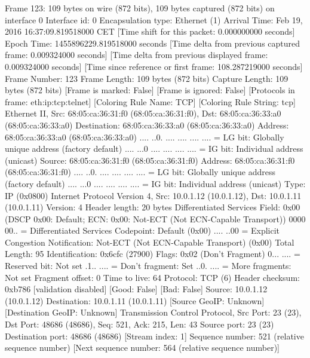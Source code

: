 Frame 123: 109 bytes on wire (872 bits), 109 bytes captured (872 bits) on interface 0
    Interface id: 0
    Encapsulation type: Ethernet (1)
    Arrival Time: Feb 19, 2016 16:37:09.819518000 CET
    [Time shift for this packet: 0.000000000 seconds]
    Epoch Time: 1455896229.819518000 seconds
    [Time delta from previous captured frame: 0.009324000 seconds]
    [Time delta from previous displayed frame: 0.009324000 seconds]
    [Time since reference or first frame: 108.287219000 seconds]
    Frame Number: 123
    Frame Length: 109 bytes (872 bits)
    Capture Length: 109 bytes (872 bits)
    [Frame is marked: False]
    [Frame is ignored: False]
    [Protocols in frame: eth:ip:tcp:telnet]
    [Coloring Rule Name: TCP]
    [Coloring Rule String: tcp]
Ethernet II, Src: 68:05:ca:36:31:f0 (68:05:ca:36:31:f0), Dst: 68:05:ca:36:33:a0 (68:05:ca:36:33:a0)
    Destination: 68:05:ca:36:33:a0 (68:05:ca:36:33:a0)
        Address: 68:05:ca:36:33:a0 (68:05:ca:36:33:a0)
        .... ..0. .... .... .... .... = LG bit: Globally unique address (factory default)
        .... ...0 .... .... .... .... = IG bit: Individual address (unicast)
    Source: 68:05:ca:36:31:f0 (68:05:ca:36:31:f0)
        Address: 68:05:ca:36:31:f0 (68:05:ca:36:31:f0)
        .... ..0. .... .... .... .... = LG bit: Globally unique address (factory default)
        .... ...0 .... .... .... .... = IG bit: Individual address (unicast)
    Type: IP (0x0800)
Internet Protocol Version 4, Src: 10.0.1.12 (10.0.1.12), Dst: 10.0.1.11 (10.0.1.11)
    Version: 4
    Header length: 20 bytes
    Differentiated Services Field: 0x00 (DSCP 0x00: Default; ECN: 0x00: Not-ECT (Not ECN-Capable Transport))
        0000 00.. = Differentiated Services Codepoint: Default (0x00)
        .... ..00 = Explicit Congestion Notification: Not-ECT (Not ECN-Capable Transport) (0x00)
    Total Length: 95
    Identification: 0x6cfc (27900)
    Flags: 0x02 (Don't Fragment)
        0... .... = Reserved bit: Not set
        .1.. .... = Don't fragment: Set
        ..0. .... = More fragments: Not set
    Fragment offset: 0
    Time to live: 64
    Protocol: TCP (6)
    Header checksum: 0xb786 [validation disabled]
        [Good: False]
        [Bad: False]
    Source: 10.0.1.12 (10.0.1.12)
    Destination: 10.0.1.11 (10.0.1.11)
    [Source GeoIP: Unknown]
    [Destination GeoIP: Unknown]
Transmission Control Protocol, Src Port: 23 (23), Dst Port: 48686 (48686), Seq: 521, Ack: 215, Len: 43
    Source port: 23 (23)
    Destination port: 48686 (48686)
    [Stream index: 1]
    Sequence number: 521    (relative sequence number)
    [Next sequence number: 564    (relative sequence number)]
